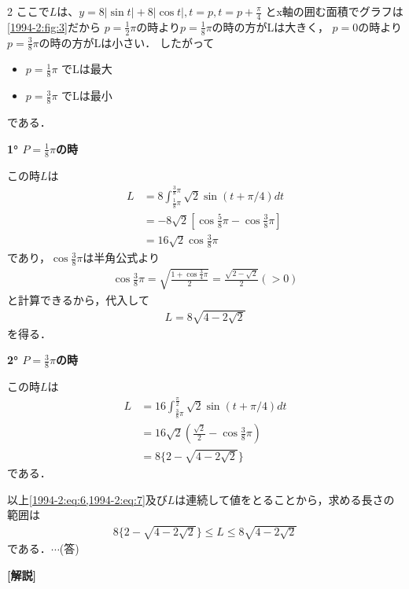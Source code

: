 \documentclass[../../../../main.tex]{subfiles}
\begin{document}
\begin{multicols}{2}
  ここで$L$は、$y=8|\sin t|+8|\cos t|, t=p, t=p+\frac{\pi}{4}$
  とx軸の囲む面積でグラフは\cref{1994-2:fig:3}だから
  $p=\frac{1}{2}\pi$の時より$p=\frac{1}{8}\pi$の時の方がLは大きく，
  $p=0$の時より$p=\frac{3}{8}\pi$の時の方がLは小さい．
  したがって
  \begin{itemize}
    \item $p=\frac{1}{8}\pi$ でLは最大 \\
    \item $p=\frac{3}{8}\pi$ でLは最小
  \end{itemize}
  である．

  \vspace{5pt}
  \textbf{1° $P=\frac{1}{8}\pi$の時}

  この時$L$は
  \begin{align*}
    L
     & = 8\int_{\frac{1}{8}\pi}^{\frac{3}{8}\pi} \sqrt{2}\sin(t+\pi/4)dt \\
     & = -8\sqrt{2}[\cos\frac{5}{8}\pi - \cos\frac{3}{8}\pi]             \\
     & = 16\sqrt{2}\cos\frac{3}{8}\pi
  \end{align*}
  であり，$\cos\frac{3}{8}\pi$は半角公式より
  \begin{align*}
    \cos\frac{3}{8}\pi = \sqrt{\frac{1+\cos\frac{3}{4}\pi}{2}} = \frac{\sqrt{2-\sqrt{2}}}{2} \left(>0\right)
  \end{align*}
  と計算できるから，代入して
  \begin{align}
    L = 8\sqrt{4-2\sqrt{2}} \label{1994-2:eq:6}
  \end{align}
  を得る．

  \vspace{5pt}
  \textbf{2° $P=\frac{3}{8}\pi$の時}

  この時$L$は
  \begin{align}
    L
     & = 16\int_{\frac{3}{8}\pi}^{\frac{\pi}{2}} \sqrt{2}\sin(t+\pi/4)dt \\
     & = 16\sqrt{2}(\frac{\sqrt{2}}{2} - \cos\frac{3}{8}\pi)             \\
     & = 8\{2-\sqrt{4-2\sqrt{2}}\} \label{1994-2:eq:7}
  \end{align}
  である．

  \vspace{5pt}
  以上\cref{1994-2:eq:6,1994-2:eq:7}及び$L$は連続して値をとることから，求める長さの範囲は
  \begin{align*}
    8\{2-\sqrt{4-2\sqrt{2}}\} \le L \le 8\sqrt{4-2\sqrt{2}}
  \end{align*}
  である．$\cdots$(答)
  \vspace{10pt}

  {\bf[解説]}

  \newpage
\end{multicols}
\end{document}
